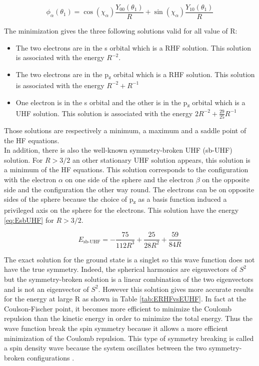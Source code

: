 \documentclass[11pt,a4paper]{article}
\begin{document}
\begin{equation}
\phi_\alpha(\theta_1)= \cos(\chi_\alpha)\frac{Y_{00}(\theta_1)}{R} + \sin(\chi_\alpha)\frac{Y_{10}(\theta_1)}{R}
\end{equation}
 
The minimization gives the three following solutions valid for all value of R:
\begin{itemize}
\item The two electrons are in the s orbital which is a RHF solution. This solution is associated with the energy $R^{-2}$.
\item The two electrons are in the p\textsubscript{z} orbital which is a RHF solution. This solution is associated with the energy $R^{-2} + R^{-1}$
\item One electron is in the s orbital and the other is in the p\textsubscript{z} orbital which is a UHF solution. This solution is associated with the energy $2R^{-2}+\frac{29}{25}R^{-1}$
\end{itemize}

Those solutions are respectively a minimum, a maximum and a saddle point of the HF equations.\\

In addition, there is also the well-known symmetry-broken UHF (sb-UHF) solution. For $R>3/2$ an other stationary UHF solution appears, this solution is a minimum of the HF equations. This solution corresponds to the configuration with the electron $\alpha$ on one side of the sphere and the electron $\beta$ on the opposite side and the configuration the other way round. The electrons can be on opposite sides of the sphere because the choice of p\textsubscript{z} as a basis function induced a privileged axis on the sphere for the electrons. This solution have the energy \eqref{eq:EsbUHF} for $R>3/2$.

\begin{equation}\label{eq:EsbUHF}
E_{\text{sb-UHF}}=-\frac{75}{112R^3}+\frac{25}{28R^2}+\frac{59}{84R}
\end{equation}

The exact solution for the ground state is a singlet so this wave function does not have the true symmetry. Indeed, the spherical harmonics are eigenvectors of $S^2$ but the symmetry-broken solution is a linear combination of the two eigenvectors and is not an eigenvector of $S^2$. However this solution gives more accurate results for the energy at large R as shown in Table \ref{tab:ERHFvsEUHF}. In fact at the Coulson-Fischer point, it becomes more efficient to minimize the Coulomb repulsion than the kinetic energy in order to minimize the total energy. Thus the wave function break the spin symmetry because it allows a more efficient minimization of the Coulomb repulsion. This type of symmetry breaking is called a spin density wave because the system oscillates between the two symmetry-broken configurations \cite{GiulianiBook}.
\end{document}
